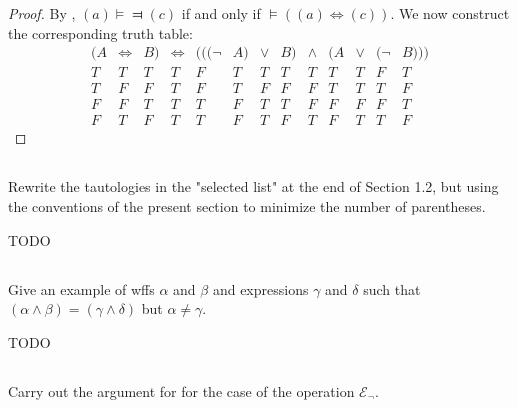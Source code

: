 \documentclass{report}
\begin{document}
\begin{proof}
      By , $(a) \vDash\Dashv (c)$ if and only if
        $\vDash ((a) \Leftrightarrow (c))$.
      We now construct the corresponding truth table:
        $$\begin{array}{s|c|s|e|c|s|c|s|c|s|c|c|s}
          (A & \Leftrightarrow & B) & \Leftrightarrow &
            (((\neg & A) & \lor & B) & \land & (A & \lor & (\neg & B))) \\
          \hline
          T & T & T & T & F & T & T & T & T & T & T & F & T \\
          T & F & F & T & F & T & F & F & F & T & T & T & F \\
          F & F & T & T & T & F & T & T & F & F & F & F & T \\
          F & T & F & T & T & F & T & F & T & F & T & T & F
        \end{array}$$

  \end{proof}

\subsection{}%

  Rewrite the tautologies in the "selected list" at the end of Section 1.2, but
    using the conventions of the present section to minimize the number of
    parentheses.

  \begin{answer}
    TODO
  \end{answer}

\subsection{}%

  Give an example of wffs $\alpha$ and $\beta$ and expressions $\gamma$ and
    $\delta$ such that $(\alpha \land \beta) = (\gamma \land \delta)$ but
    $\alpha \neq \gamma$.

  \begin{answer}
    TODO
  \end{answer}

\subsection{}%

  Carry out the argument for  for the case of the
    operation $\mathcal{E}_{\neg}$.
\end{document}

